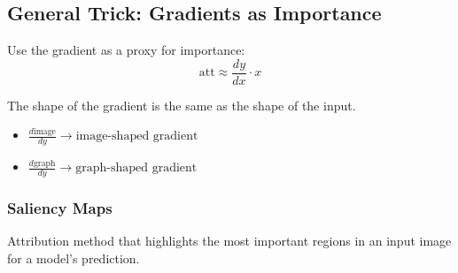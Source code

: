 \subsection{General Trick: Gradients as Importance}
\begin{definition}
    Use the gradient as a proxy for importance:
    \begin{equation*}
        \text{att} \approx \frac{dy}{dx} \cdot x
    \end{equation*}
\end{definition}

\begin{warning}
    The shape of the gradient is the same as the shape of the input.
    \begin{itemize}
        \item $\frac{d\text{image}}{dy} \rightarrow \text{image-shaped gradient}$
    \end{itemize}
    \begin{itemize}
        \item $\frac{d\text{graph}}{dy} \rightarrow \text{graph-shaped gradient}$
    \end{itemize}
\end{warning}

\subsubsection{Saliency Maps}
\begin{definition}
    Attribution method that highlights the most important regions in an input image for a model's prediction. 
\end{definition}


